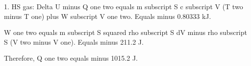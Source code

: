 1. HS gas:  
Delta U minus Q one two equals m subscript S c subscript V (T two minus T one) plus W subscript V one two.  
Equals minus 0.80333 kJ.  

W one two equals m subscript S squared rho subscript S dV minus rho subscript S (V two minus V one).  
Equals minus 211.2 J.  

Therefore, Q one two equals minus 1015.2 J.